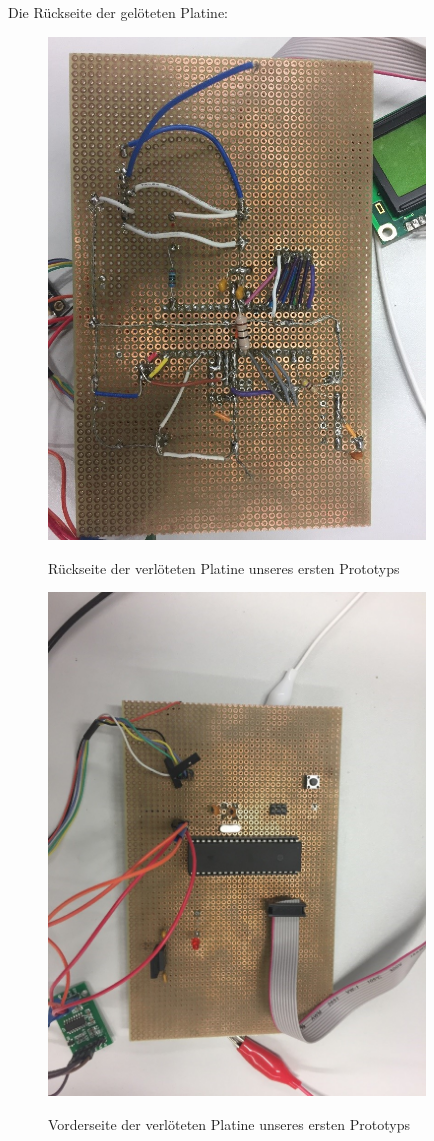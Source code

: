 \noindent
Die Rückseite der gelöteten Platine:
\begin{figure}[H]
    \center
    \includegraphics[width=10cm]{Bilder/schaltplan-2.jpg}\\
    \caption{Rückseite der verlöteten Platine unseres ersten Prototyps}
    \label{fig:schaltplan-rueckseite}
\end{figure}
\begin{figure}[H]
    \center
    \includegraphics[width=10cm]{Bilder/schaltplan-3.jpg}\\
    \caption{Vorderseite der verlöteten Platine unseres ersten Prototyps}
    \label{fig:schaltplan-vorderseite}
\end{figure}
